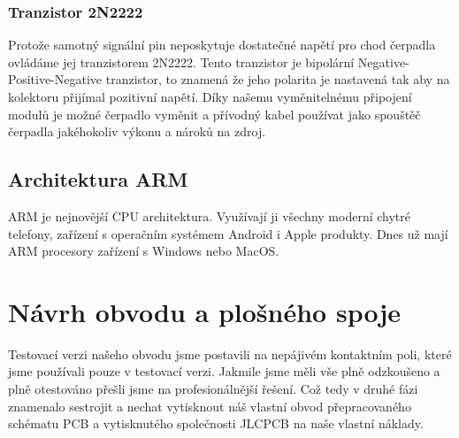\documentclass[12pt,a4paper]{article}
\begin{document}
\subsubsection{Tranzistor 2N2222}

Protože samotný signální pin neposkytuje dostatečné napětí pro chod čerpadla
ovládáme jej tranzistorem 2N2222. Tento tranzistor je bipolární
Negative-Positive-Negative tranzistor, to znamená že jeho polarita je nastavená
tak aby na kolektoru přijímal pozitivní napětí. Díky našemu vyměnitelnému
připojení modulů je
možné čerpadlo vyměnit a přívodný kabel používat jako spouštěč čerpadla
jakéhokoliv výkonu a nároků na zdroj.

\subsection{Architektura ARM}

\ac{ARM} je nejnovější \ac{CPU} architektura. Využívají ji všechny moderní
chytré
telefony, zařízení s operačním systémem Android i Apple produkty. Dnes už mají
\ac{ARM} procesory zařízení s Windows nebo MacOS.


\clearpage

\section{Návrh obvodu a plošného spoje}

Testovací verzi našeho obvodu jsme postavili na nepájivém kontaktním poli,
které jsme používali pouze v testovací verzi. Jakmile jsme měli vše plně
odzkoušeno a plně otestováno přešli jsme na profesionálnější řešení.
Což tedy v druhé fázi znamenalo sestrojit a nechat vytisknout náš vlastní obvod
přepracovaného schématu \ac{PCB} a vytisknutého společnosti JLCPCB na naše
vlastní
náklady.
\end{document}
